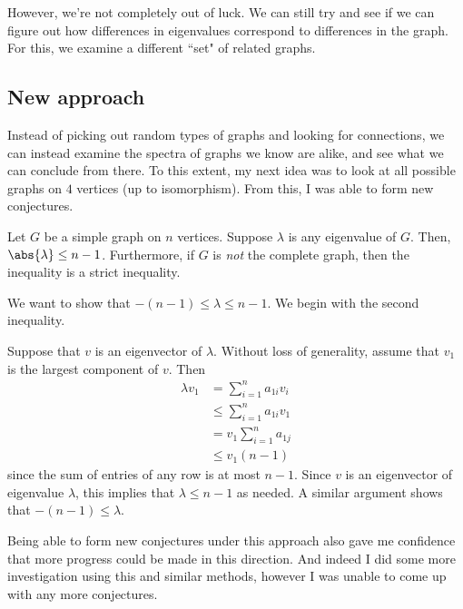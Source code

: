 \documentclass{article}
\begin{document}
However, we're not completely out of luck.
We can still try and see if we can figure out how differences in eigenvalues correspond to differences in the graph.
For this, we examine a different ``set" of related graphs.

\subsection{New approach}

Instead of picking out random types of graphs and looking for connections, we can instead examine the spectra of graphs we know are alike, and see what we can conclude from there.
To this extent, my next idea was to look at all possible graphs on $ 4 $ vertices (up to isomorphism).
From this, I was able to form new conjectures.

\begin{thm}
Let $ G $ be a simple graph on $ n $ vertices. \vsp
Suppose $ \lambda $ is any eigenvalue of $ G $. Then, $ \abs{\lambda} \leq n - 1 $.
Furthermore, if $ G $ is \textit{not} the complete graph, then the inequality is a strict inequality.
\end{thm}

\begin{pf}[source=Jack McAsh and Myself]
We want to show that $ -(n - 1) \leq \lambda \leq n - 1 $. We begin with the second inequality. \npgh

Suppose that $ v $ is an eigenvector of $ \lambda $. Without loss of generality, assume that $ v_{1} $ is the largest component of $ v $.
Then
\begin{align*}
    \lambda v_{1} & = \sum_{i=1}^{n} {a_{1i}v_{i}} \\
                  & \leq \sum_{i=1}^{n} {a_{1i}v_{1}} \\
                  & = v_{1}\sum_{i=1}^{n} {a_{1j}} \\
                  & \leq v_{1}(n-1)
\end{align*}
since the sum of entries of any row is at most $ n-1 $.
Since $ v $ is an eigenvector of eigenvalue $ \lambda $, this implies that $ \lambda \leq n - 1 $ as needed.
A similar argument shows that $ -(n-1) \leq \lambda $.
\end{pf}

Being able to form new conjectures under this approach also gave me confidence that more progress could be made in this direction.
And indeed I did some more investigation using this and similar methods, however I was unable to come up with any more conjectures.
\end{document}
